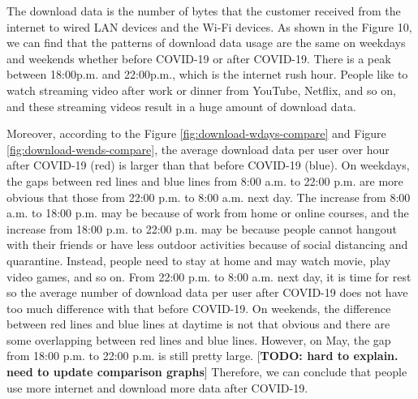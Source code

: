 \documentclass[conference,10pt]{IEEEtran}
\begin{document}
The download data is the number of bytes that the customer received from the internet to wired LAN devices and the Wi-Fi devices. As shown in the Figure 10, we can find that the patterns of download data usage are the same on weekdays and weekends whether before COVID-19 or after COVID-19. There is a peak between 18:00p.m. and 22:00p.m., which is the internet rush hour\cite{internetrushhour}. People like to watch streaming video after work or dinner from YouTube, Netflix, and so on, and these streaming videos result in a huge amount of download data. 

Moreover, according to the Figure \ref{fig:download-wdays-compare} and Figure \ref{fig:download-wends-compare}, the average download data per user over hour after COVID-19 (red) is larger than that before COVID-19 (blue). On weekdays, the gaps between red lines and blue lines from 8:00 a.m. to 22:00 p.m. are more obvious that those from 22:00 p.m. to 8:00 a.m. next day. The increase from 8:00 a.m. to 18:00 p.m. may be because of work from home or online courses, and the increase from 18:00 p.m. to 22:00 p.m. may be because people cannot hangout with their friends or have less outdoor activities because of social distancing and quarantine. Instead, people need to stay at home and may watch movie, play video games, and so on. From 22:00 p.m. to 8:00 a.m. next day, it is time for rest so the average number of download data per user after COVID-19 does not have too much difference with that before COVID-19. On weekends, the difference between red lines and blue lines at daytime is not that obvious and there are some overlapping between red lines and blue lines. However, on May, the gap from 18:00 p.m. to 22:00 p.m. is still pretty large. [\textbf{TODO: hard to explain. need to update comparison graphs}] Therefore, we can conclude that people use more internet and download more data after COVID-19.
\end{document}
